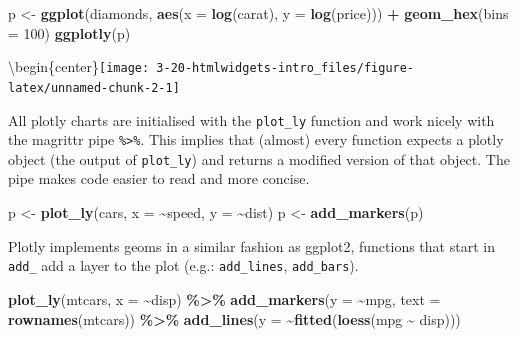 \documentclass[
]{krantz}
\makeatletter
\newenvironment{Shaded}{\begin{snugshade}}{\end{snugshade}}
\newcommand{\DataTypeTok}[1]{\textcolor[rgb]{0.27,0.27,0.27}{#1}}
\newcommand{\DecValTok}[1]{\textcolor[rgb]{0.06,0.06,0.06}{#1}}
\newcommand{\KeywordTok}[1]{\textcolor[rgb]{0.27,0.27,0.27}{\textbf{#1}}}
\newcommand{\NormalTok}[1]{#1}
\newcommand{\OperatorTok}[1]{\textcolor[rgb]{0.43,0.43,0.43}{\textbf{#1}}}
\newcommand{\StringTok}[1]{\textcolor[rgb]{0.5,0.5,0.5}{#1}}
\newenvironment{kframe}{%
\medskip{}
\setlength{\fboxsep}{.8em}
 \def\at@end@of@kframe{}%
 \ifinner\ifhmode%
  \def\at@end@of@kframe{\end{minipage}}%
  \begin{minipage}{\columnwidth}%
 \fi\fi%
 \def\FrameCommand##1{\hskip\@totalleftmargin \hskip-\fboxsep
 \colorbox{shadecolor}{##1}\hskip-\fboxsep
     \hskip-\linewidth \hskip-\@totalleftmargin \hskip\columnwidth}%
 \MakeFramed {\advance\hsize-\width
   \@totalleftmargin\z@ \linewidth\hsize
   \@setminipage}}%
 {\par\unskip\endMakeFramed%
 \at@end@of@kframe}
\renewenvironment{Shaded}{\begin{kframe}}{\end{kframe}}
\makeatother
\begin{document}
\begin{Shaded}
\begin{Highlighting}[]
\NormalTok{p <{-}}\StringTok{ }\KeywordTok{ggplot}\NormalTok{(diamonds, }\KeywordTok{aes}\NormalTok{(}\DataTypeTok{x =} \KeywordTok{log}\NormalTok{(carat), }\DataTypeTok{y =} \KeywordTok{log}\NormalTok{(price))) }\OperatorTok{+}\StringTok{ }
\StringTok{  }\KeywordTok{geom\_hex}\NormalTok{(}\DataTypeTok{bins =} \DecValTok{100}\NormalTok{)}
\KeywordTok{ggplotly}\NormalTok{(p)}
\end{Highlighting}
\end{Shaded}

\textbackslash begin\{center\}\texttt{[image: 3-20-htmlwidgets-intro\_files/figure-latex/unnamed-chunk-2-1]}

All plotly charts are initialised with the \texttt{plot\_ly} function and work nicely with the magrittr \citep{R-magrittr} pipe \texttt{\%\textgreater{}\%}. This implies that (almost) every function expects a plotly object (the output of \texttt{plot\_ly}) and returns a modified version of that object. The pipe makes code easier to read and more concise.

\begin{Shaded}
\begin{Highlighting}[]
\NormalTok{p <{-}}\StringTok{ }\KeywordTok{plot\_ly}\NormalTok{(cars, }\DataTypeTok{x =} \OperatorTok{\textasciitilde{}}\NormalTok{speed, }\DataTypeTok{y =} \OperatorTok{\textasciitilde{}}\NormalTok{dist) }
\NormalTok{p <{-}}\StringTok{ }\KeywordTok{add\_markers}\NormalTok{(p)}
\end{Highlighting}
\end{Shaded}

Plotly implements geoms in a similar fashion as ggplot2, functions that start in \texttt{add\_} add a layer to the plot (e.g.: \texttt{add\_lines}, \texttt{add\_bars}).

\begin{Shaded}
\begin{Highlighting}[]
\KeywordTok{plot\_ly}\NormalTok{(mtcars, }\DataTypeTok{x =} \OperatorTok{\textasciitilde{}}\NormalTok{disp) }\OperatorTok{\%>\%}\StringTok{ }
\StringTok{  }\KeywordTok{add\_markers}\NormalTok{(}\DataTypeTok{y =} \OperatorTok{\textasciitilde{}}\NormalTok{mpg, }\DataTypeTok{text =} \KeywordTok{rownames}\NormalTok{(mtcars)) }\OperatorTok{\%>\%}\StringTok{ }
\StringTok{  }\KeywordTok{add\_lines}\NormalTok{(}\DataTypeTok{y =} \OperatorTok{\textasciitilde{}}\KeywordTok{fitted}\NormalTok{(}\KeywordTok{loess}\NormalTok{(mpg }\OperatorTok{\textasciitilde{}}\StringTok{ }\NormalTok{disp)))}
\end{Highlighting}
\end{Shaded}
\end{document}
